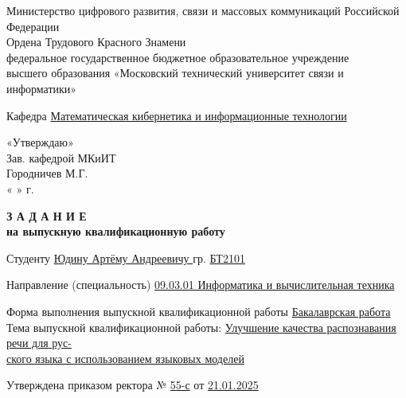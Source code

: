 
{
\newpage
\fontsize{12pt}{12pt}\selectfont
\begin{center}
    \noindent Министерство цифрового развития, связи и массовых коммуникаций Российской Федерации\\Ордена Трудового Красного Знамени \\ 
федеральное государственное бюджетное образовательное учреждение\\
высшего образования 
«Московский технический университет связи и информатики»
\end{center}
\noindent Кафедра \underline{Математическая кибернетика и информационные технологии} \hfill
\vspace{0.1cm}
\noindent
\begin{minipage}[t]{6cm}
«Утверждаю»\\
Зав. кафедрой  МКиИТ \\
Городничев М.Г.\\
« \hrulefill »  г.
\end{minipage}
\thispagestyle{empty}

\vspace{0.5cm}

\begin{center}
\textbf{З А Д А Н И Е}\\
\textbf{на выпускную квалификационную работу}
\end{center}

\vspace{0.3cm}

\noindent Студенту \underline{Юдину Артёму Андреевичу \hfill } гр. \underline{БТ2101}

\vspace{0.2cm}

\noindent Направление (специальность) \underline{09.03.01 Информатика и вычислительная техника}

\vspace{0.2cm}

\noindent Форма выполнения выпускной квалификационной работы \underline{Бакалаврская работа} \\
Тема выпускной квалификационной работы: \underline{Улучшение качества распознавания речи для рус-}\\\underline{ского языка с использованием языковых моделей}


\noindent Утверждена приказом ректора № \underline{55-с} \hfill от \underline{21.01.2025}

\vspace{0.2cm}

}
